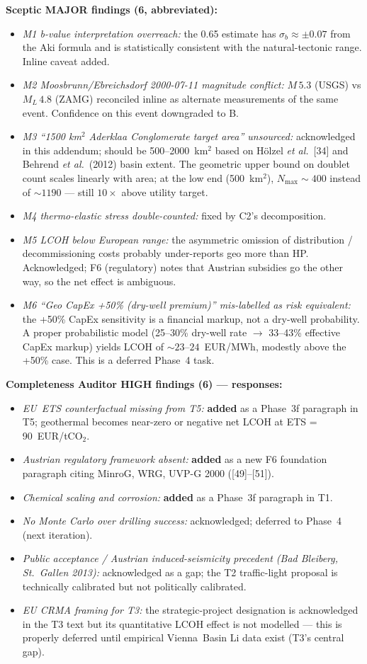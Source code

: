 \documentclass{article}
\begin{document}
\textbf{Sceptic MAJOR findings (6, abbreviated):}
\begin{itemize}
\item \emph{M1 b-value interpretation overreach:} the 0.65 estimate has
$\sigma_b \approx \pm 0.07$ from the Aki formula and is statistically
consistent with the natural-tectonic range. Inline caveat added.
\item \emph{M2 Moosbrunn/Ebreichsdorf 2000-07-11 magnitude conflict:}
$M\,5.3$ (USGS) vs $M_L\,4.8$ (ZAMG) reconciled inline as alternate
measurements of the same event. Confidence on this event downgraded to B.
\item \emph{M3 ``1500 km$^2$ Aderklaa Conglomerate target area'' unsourced:}
acknowledged in this addendum; should be 500--2000~km$^2$ based on
H\"olzel \emph{et al.}\ [34] and Behrend \emph{et al.}\ (2012) basin
extent. The geometric upper bound on doublet count scales linearly
with area; at the low end (500~km$^2$), $N_{\max}\sim 400$ instead of
$\sim 1190$ --- still $10\times$ above utility target.
\item \emph{M4 thermo-elastic stress double-counted:} fixed by C2's
decomposition.
\item \emph{M5 LCOH below European range:} the asymmetric omission of
distribution / decommissioning costs probably under-reports geo more
than HP. Acknowledged; F6 (regulatory) notes that Austrian subsidies
go the other way, so the net effect is ambiguous.
\item \emph{M6 ``Geo CapEx +50\% (dry-well premium)'' mis-labelled
as risk equivalent:} the +50\% CapEx sensitivity is a financial
markup, not a dry-well probability. A proper probabilistic model
(25--30\% dry-well rate $\to$ 33--43\% effective CapEx markup)
yields LCOH of $\sim 23$--$24$~EUR/MWh, modestly above the +50\%
case. This is a deferred Phase~4 task.
\end{itemize}

\textbf{Completeness Auditor HIGH findings (6) --- responses:}
\begin{itemize}
\item \emph{EU~ETS counterfactual missing from T5:} \textbf{added}
as a Phase~3f paragraph in T5; geothermal becomes near-zero or
negative net LCOH at ETS = 90~EUR/tCO$_2$.
\item \emph{Austrian regulatory framework absent:} \textbf{added}
as a new F6 foundation paragraph citing MinroG, WRG, UVP-G 2000
([49]--[51]).
\item \emph{Chemical scaling and corrosion:} \textbf{added} as a
Phase~3f paragraph in T1.
\item \emph{No Monte Carlo over drilling success:} acknowledged;
deferred to Phase~4 (next iteration).
\item \emph{Public acceptance / Austrian induced-seismicity
precedent (Bad Bleiberg, St.\ Gallen 2013):} acknowledged as a gap;
the T2 traffic-light proposal is technically calibrated but not
politically calibrated.
\item \emph{EU CRMA framing for T3:} the strategic-project
designation is acknowledged in the T3 text but its quantitative
LCOH effect is not modelled --- this is properly deferred until
empirical Vienna~Basin Li data exist (T3's central gap).
\end{itemize}
\end{document}
